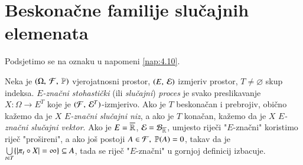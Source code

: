 
\chapter{Beskona\v cne familije slu\v cajnih elemenata}

Podsjetimo se na oznaku u napomeni \ref{nap:4.10}.

\begin{defn}    \label{defn:8.1}
    Neka je $(\Omega, \: \mathcal{F}, \: \mathbb{P})$ vjerojatnosni prostor, $({E}, \: {\mathcal{E}})$ izmjeriv prostor, $T \neq \varnothing$ skup indeksa.
    \emph{$E$-zna\v cni stohasti\v cki} (ili \emph{slu\v cajni}) \emph{proces} je svako preslikavanje $X : \Omega \to E^T$ koje je $({\mathcal{F}}, \: {\mathcal{E}^T})$-izmjerivo.
    Ako je $T$ beskona\v can i prebrojiv, obi\v cno ka\v zemo da je $X$ \emph{$E$-zna\v cni slu\v cajni niz}, a ako je $T$ kona\v can, ka\v zemo da je $X$ \emph{$E$-zna\v cni slu\v cajni vektor}.
    Ako je $E = \overline{\mathbb{R}}$, $\mathcal{E} = \mathcal{B}_{\overline{\mathbb{R}}}$, umjesto rije\v ci "$E$-zna\v cni" koristimo rije\v c "pro\v sireni", a ako jo\v s postoji $A \in \mathcal{F}, \; \mathbb{P}({A}) = 0$, takav da je $\bigcup\limits_{t \in T}^{} \{ |\pi_t \circ X| = \infty \} \subseteq A$, tada se rije\v c "$E$-zna\v cni" u gornjoj definicij izbacuje.
\end{defn}

